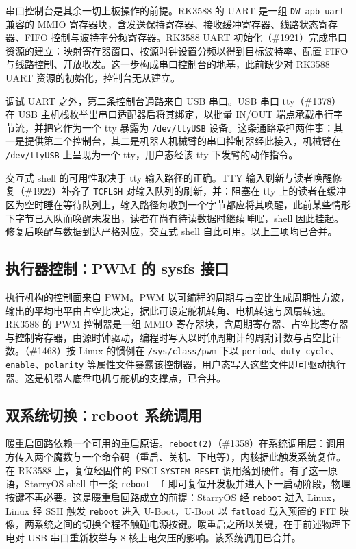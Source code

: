 串口控制台是其余一切上板操作的前提。RK3588 的 UART 是一组 \texttt{DW\_apb\_uart} 兼容的 MMIO 寄存器块，含发送保持寄存器、接收缓冲寄存器、线路状态寄存器、FIFO 控制与波特率分频寄存器。RK3588 UART 初始化（\#1921）完成串口资源的建立：映射寄存器窗口、按源时钟设置分频以得到目标波特率、配置 FIFO 与线路控制、开放收发。这一步构成串口控制台的地基，此前缺少对 RK3588 UART 资源的初始化，控制台无从建立。

调试 UART 之外，第二条控制台通路来自 USB 串口。USB 串口 tty（\#1378）在 USB 主机栈枚举出串口适配器后将其绑定，以批量 IN/OUT 端点承载串行字节流，并把它作为一个 tty 暴露为 \texttt{/dev/ttyUSB} 设备。这条通路承担两件事：其一是提供第二个控制台，其二是机器人机械臂的串口控制器经此接入，机械臂在 \texttt{/dev/ttyUSB} 上呈现为一个 tty，用户态经该 tty 下发臂的动作指令。

交互式 shell 的可用性取决于 tty 输入路径的正确。TTY 输入刷新与读者唤醒修复（\#1922）补齐了 \texttt{TCFLSH} 对输入队列的刷新，并：阻塞在 tty 上的读者在缓冲区为空时睡在等待队列上，输入路径每收到一个字节都应将其唤醒，此前某些情形下字节已入队而唤醒未发出，读者在尚有待读数据时继续睡眠，shell 因此挂起。修复后唤醒与数据到达严格对应，交互式 shell 自此可用。以上三项均已合并。

\subsection{执行器控制：PWM 的 sysfs 接口}

执行机构的控制面来自 PWM。PWM 以可编程的周期与占空比生成周期性方波，输出的平均电平由占空比决定，据此可设定舵机转角、电机转速与风扇转速。RK3588 的 PWM 控制器是一组 MMIO 寄存器块，含周期寄存器、占空比寄存器与控制寄存器，由源时钟驱动，编程时写入以时钟周期计的周期计数与占空比计数。（\#1468）按 Linux 的惯例在 \texttt{/sys/class/pwm} 下以 \texttt{period}、\texttt{duty\_cycle}、\texttt{enable}、\texttt{polarity} 等属性文件暴露该控制器，用户态写入这些文件即可驱动执行器。这是机器人底盘电机与舵机的支撑点，已合并。

\subsection{双系统切换：reboot 系统调用}

暖重启回路依赖一个可用的重启原语。\texttt{reboot(2)}（\#1358）在系统调用层：调用方传入两个魔数与一个命令码（重启、关机、下电等），内核据此触发系统复位。在 RK3588 上，复位经固件的 PSCI \texttt{SYSTEM\_RESET} 调用落到硬件。有了这一原语，StarryOS shell 中一条 \texttt{reboot -f} 即可复位开发板并进入下一启动阶段，物理按键不再必要。这是暖重启回路成立的前提：StarryOS 经 \texttt{reboot} 进入 Linux，Linux 经 SSH 触发 \texttt{reboot} 进入 U-Boot，U-Boot 以 \texttt{fatload} 载入预置的 FIT 映像，两系统之间的切换全程不触碰电源按键。暖重启之所以关键，在于前述物理下电对 USB 串口重新枚举与 8 核上电欠压的影响。该系统调用已合并。


